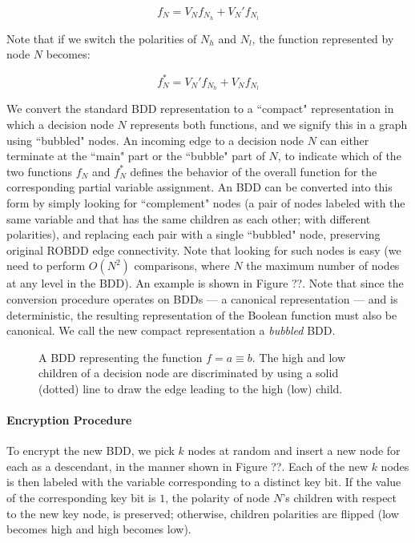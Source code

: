\[f_N=V_N f_{N_h}+V_N' f_{N_l}\]

Note that if we switch the polarities of $N_h$ and $N_l$, the function represented by node $N$ becomes:

\[f_N^*=V_N' f_{N_h}+V_N f_{N_l}\]

We convert the standard BDD representation to a ``compact" representation in which a decision node $N$ represents both functions, and we signify this in a graph using ``bubbled" nodes. An incoming edge to a decision node $N$ can either terminate at the ``main" part or the ``bubble" part of $N$, to indicate which of the two functions $f_N$ and $f_N^*$ defines the behavior of the overall function for the corresponding partial variable assignment. An BDD can be converted into this form by simply looking for ``complement" nodes (a pair of nodes labeled with the same variable and that has the same children as each other; with different polarities), and replacing each pair with a single ``bubbled" node, preserving original ROBDD edge connectivity. Note that looking for such nodes is easy (we need to perform $O(N^2)$ comparisons, where $N$ the maximum number of nodes at any level in the BDD). An example is shown in Figure ??. Note that since the conversion procedure operates on BDDs --- a canonical representation --- and is deterministic, the resulting representation of the Boolean function must also be canonical. We call the new compact representation a \emph{bubbled} BDD.

\begin{lemma}

\end{lemma}

\begin{figure}[ht]
  \caption{A BDD representing the function $f = a \equiv b$. The high and low children of a decision node are discriminated by using a solid (dotted) line to draw the edge leading to the high (low) child.}
  \label{fig:dummy4}
\end{figure}

\paragraph{Encryption Procedure}  To encrypt the new BDD, we pick $k$ nodes at random and insert a new node for each as a descendant, in the manner shown in Figure ??. Each of the new $k$ nodes is then labeled with the variable corresponding to a distinct key bit. If the value of the corresponding key bit is $1$, the polarity of node $N$'s children with respect to the new key node, is preserved; otherwise, children polarities are flipped (low becomes high and high becomes low). %

